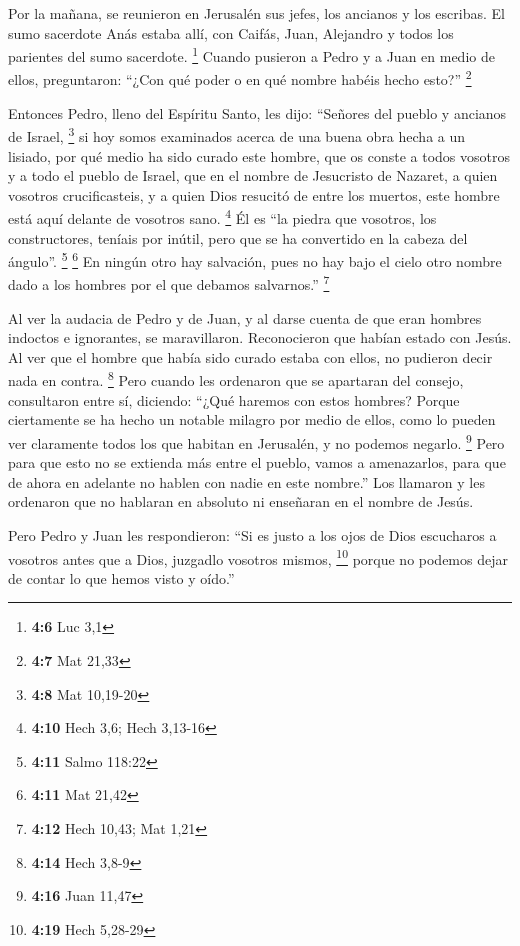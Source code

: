  Por la mañana, se reunieron en Jerusalén sus jefes, los
ancianos y los escribas.  El sumo sacerdote Anás estaba
allí, con Caifás, Juan, Alejandro y todos los parientes del sumo
sacerdote. \footnote{\textbf{4:6} Luc 3,1}  Cuando
pusieron a Pedro y a Juan en medio de ellos, preguntaron: ``¿Con qué
poder o en qué nombre habéis hecho esto?'' \footnote{\textbf{4:7} Mat
  21,33}

 Entonces Pedro, lleno del Espíritu Santo, les dijo:
``Señores del pueblo y ancianos de Israel, \footnote{\textbf{4:8} Mat
  10,19-20}  si hoy somos examinados acerca de una buena
obra hecha a un lisiado, por qué medio ha sido curado este hombre,
 que os conste a todos vosotros y a todo el pueblo de
Israel, que en el nombre de Jesucristo de Nazaret, a quien vosotros
crucificasteis, y a quien Dios resucitó de entre los muertos, este
hombre está aquí delante de vosotros sano. \footnote{\textbf{4:10} Hech
  3,6; Hech 3,13-16}  Él es ``la piedra que vosotros, los
constructores, teníais por inútil, pero que se ha convertido en la
cabeza del ángulo''. \footnote{\textbf{4:11} Salmo 118:22} \footnote{\textbf{4:11}
  Mat 21,42}  En ningún otro hay salvación, pues no hay
bajo el cielo otro nombre dado a los hombres por el que debamos
salvarnos.'' \footnote{\textbf{4:12} Hech 10,43; Mat 1,21}

 Al ver la audacia de Pedro y de Juan, y al darse cuenta
de que eran hombres indoctos e ignorantes, se maravillaron. Reconocieron
que habían estado con Jesús.  Al ver que el hombre que
había sido curado estaba con ellos, no pudieron decir nada en contra.
\footnote{\textbf{4:14} Hech 3,8-9}  Pero cuando les
ordenaron que se apartaran del consejo, consultaron entre sí,
 diciendo: ``¿Qué haremos con estos hombres? Porque
ciertamente se ha hecho un notable milagro por medio de ellos, como lo
pueden ver claramente todos los que habitan en Jerusalén, y no podemos
negarlo. \footnote{\textbf{4:16} Juan 11,47}  Pero para
que esto no se extienda más entre el pueblo, vamos a amenazarlos, para
que de ahora en adelante no hablen con nadie en este nombre.''
 Los llamaron y les ordenaron que no hablaran en absoluto
ni enseñaran en el nombre de Jesús.

 Pero Pedro y Juan les respondieron: ``Si es justo a los
ojos de Dios escucharos a vosotros antes que a Dios, juzgadlo vosotros
mismos, \footnote{\textbf{4:19} Hech 5,28-29}  porque no
podemos dejar de contar lo que hemos visto y oído.''

